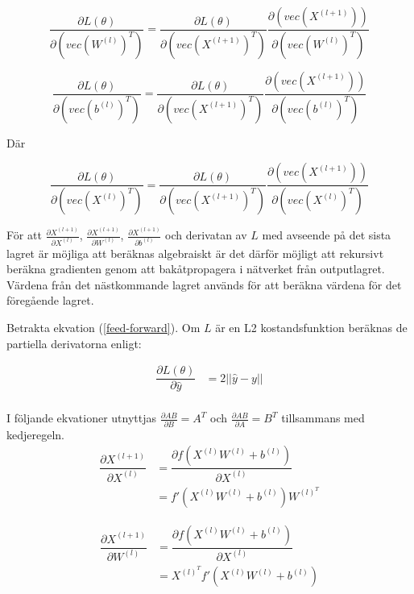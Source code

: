 \documentclass[a4paper,11pt,twoside]{article}
\newcommand*{\pd}[2]{\ensuremath{\dfrac{\partial #1}{\partial #2}}}
\newcommand*{\inpd}[2]{\ensuremath{\frac{\partial #1}{\partial #2}}}
\begin{document}
\begin{equation}
\pd{L(\theta)}{(vec(W^{(l)})^T)} = \pd{L(\theta)}{(vec(X^{(l+1)})^T)} \pd{(vec(X^{(l+1)}))}{(vec(W^{(l)})^T)}
\end{equation}

\begin{equation}
\pd{L(\theta)}{(vec(b^{(l)})^T)} = \pd{L(\theta)}{(vec(X^{(l+1)})^T)} \pd{(vec(X^{(l+1)}))}{(vec(b^{(l)})^T)}
\end{equation}

Där

\begin{equation}
\pd{L(\theta)}{(vec(X^{(l)})^T)} = \pd{L(\theta)}{(vec(X^{(l+1)})^T)} \pd{(vec(X^{(l+1)}))}{(vec(X^{(l)})^T)}
\end{equation}

För att $\inpd{X^{(l+1)}}{X^{(l)}}$, $\inpd{X^{(l+1)}}{W^{(l)}}$, $\inpd{X^{(l+1)}}{b^{(l)}}$ och derivatan av $L$ med avseende på det sista lagret är möjliga att beräknas algebraiskt är det därför möjligt att rekursivt beräkna gradienten genom att bakåtpropagera i nätverket från outputlagret. Värdena från det nästkommande lagret används för att beräkna värdena för det föregående lagret.

Betrakta ekvation (\ref{feed-forward}). Om $L$ är en L2 kostandsfunktion beräknas de partiella derivatorna enligt:

\begin{equation}
\begin{split}
\pd{L(\theta)}{\hat{y}} 
				& = 2 ||\hat{y}-y|| \\
\end{split}
\end{equation}

I följande ekvationer utnyttjas $\inpd{AB}{B} = A^T$ och $\inpd{AB}{A} = B^T$ tillsammans med kedjeregeln.
\begin{equation}
\begin{split}
\pd{X^{(l+1)}}{X^{(l)}} 
				& = \pd{f(X^{(l)}W^{(l)} +b^{(l)})}{X^{(l)}}  \\
				& = f'(X^{(l)}W^{(l)}+b^{(l)})W^{(l)^T}
\end{split}
\end{equation}

\begin{equation}
\begin{split}
\pd{X^{(l+1)}}{W^{(l)}} 
				& = \pd{f(X^{(l)}W^{(l)} +b^{(l)})}{X^{(l)}}  \\
				& = X^{(l)^T}f'(X^{(l)}W^{(l)}+b^{(l)})
\end{split}
\end{equation}
\end{document}
